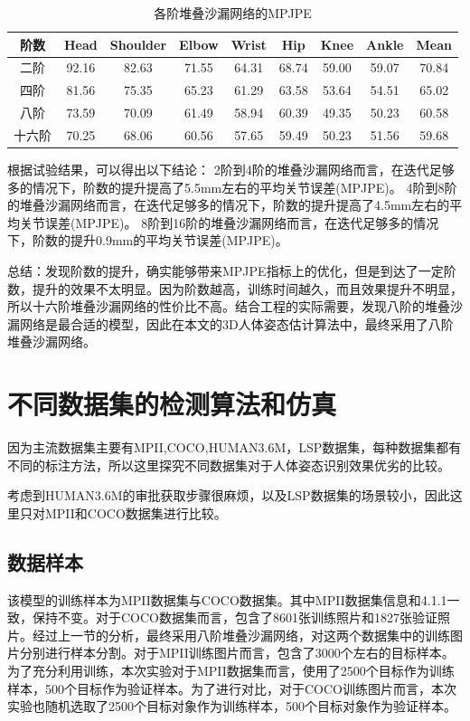 \begin{table}[]
    \centering
    \begin{tabular}{c|c|c|c|c|c|c|c|c}
        \hline
         阶数 & Head & Shoulder	& Elbow	& Wrist	& Hip & Knee & Ankle & Mean\\
        \hline
         二阶 & 92.16 & 82.63 & 71.55 & 64.31 & 68.74 & 59.00 & 59.07 & 70.84\\
        \hline
         四阶 & 81.56 & 75.35 & 65.23 & 61.29 & 63.58 & 53.64 & 54.51 & 65.02\\
        \hline
         八阶 & 73.59 & 70.09 & 61.49 & 58.94 & 60.39 & 49.35 & 50.23 & 60.58\\
        \hline
         十六阶 & 70.25 & 68.06 & 60.56 & 57.65 & 59.49 & 50.23 & 51.56 & 59.68\\
        \hline
    \end{tabular}
    \caption{各阶堆叠沙漏网络的MPJPE}
    \label{MPII_dataset}
\end{table}

根据试验结果，可以得出以下结论：
2阶到4阶的堆叠沙漏网络而言，在迭代足够多的情况下，阶数的提升提高了5.5mm左右的平均关节误差(MPJPE)。
4阶到8阶的堆叠沙漏网络而言，在迭代足够多的情况下，阶数的提升提高了4.5mm左右的平均关节误差(MPJPE)。
8阶到16阶的堆叠沙漏网络而言，在迭代足够多的情况下，阶数的提升0.9mm的平均关节误差(MPJPE)。

总结：发现阶数的提升，确实能够带来MPJPE指标上的优化，但是到达了一定阶数，提升的效果不太明显。因为阶数越高，训练时间越久，而且效果提升不明显，所以十六阶堆叠沙漏网络的性价比不高。结合工程的实际需要，发现八阶的堆叠沙漏网络是最合适的模型，因此在本文的3D人体姿态估计算法中，最终采用了八阶堆叠沙漏网络。

\section{不同数据集的检测算法和仿真}

因为主流数据集主要有MPII,COCO,HUMAN3.6M，LSP数据集，每种数据集都有不同的标注方法，所以这里探究不同数据集对于人体姿态识别效果优劣的比较。

考虑到HUMAN3.6M的审批获取步骤很麻烦，以及LSP数据集的场景较小，因此这里只对MPII和COCO数据集进行比较。

\subsection{数据样本}

该模型的训练样本为MPII数据集与COCO数据集。其中MPII数据集信息和4.1.1一致，保持不变。对于COCO数据集而言，包含了8601张训练照片和1827张验证照片。经过上一节的分析，最终采用八阶堆叠沙漏网络，对这两个数据集中的训练图片分别进行样本分割。对于MPII训练图片而言，包含了3000个左右的目标样本。为了充分利用训练，本次实验对于MPII数据集而言，使用了2500个目标作为训练样本，500个目标作为验证样本。为了进行对比，对于COCO训练图片而言，本次实验也随机选取了2500个目标对象作为训练样本，500个目标对象作为验证样本。

